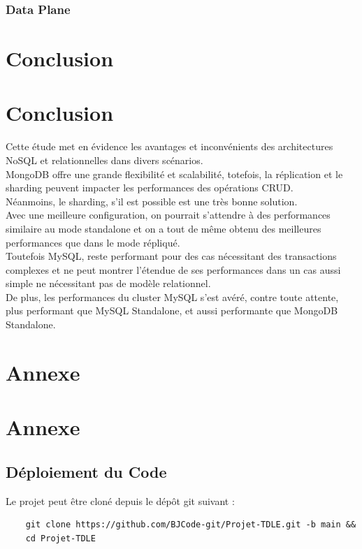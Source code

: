 \documentclass[12pt,a4paper]{report}
\newcommand*\sectiontitle{}
\let\origsection\section
\renewcommand*{\section}[2][]{%
\ifx\setminus#1\setminus%
  \origsection{#2}%
  \renewcommand*\sectiontitle{#2}%
\else
  \origsection[#1]{#2}%
  \renewcommand*\sectiontitle{#1}%
\fi
}
\begin{document}
        \subsubsection{Data Plane}



\section{Conclusion}

    \begin{card}
        Cette étude met en évidence les avantages et inconvénients des architectures NoSQL et relationnelles dans divers scénarios. \\
        MongoDB offre une grande flexibilité et scalabilité, totefois, la réplication et le sharding peuvent impacter les performances des opérations CRUD. \\
        Néanmoins, le sharding, s'il est possible est une très bonne solution. \\
        Avec une meilleure configuration, on pourrait s'attendre à des performances similaire au mode standalone et on a tout de même obtenu des meilleures performances que dans le mode répliqué. \\
        Toutefois MySQL, reste performant pour des cas nécessitant des transactions complexes et ne peut montrer l'étendue de ses performances dans un cas aussi simple ne nécessitant pas de modèle relationnel. \\
        De plus, les performances du cluster MySQL s'est avéré, contre toute attente, plus performant que MySQL Standalone, et aussi performante que MongoDB Standalone. \\
    \end{card}


\appendix
\section{Annexe}
\subsection{Déploiement du Code}


Le projet peut être cloné depuis le dépôt git suivant : 
\begin{card}
    \begin{verbatim}
    git clone https://github.com/BJCode-git/Projet-TDLE.git -b main &&
    cd Projet-TDLE
\end{verbatim}
\end{card}
\end{document}
